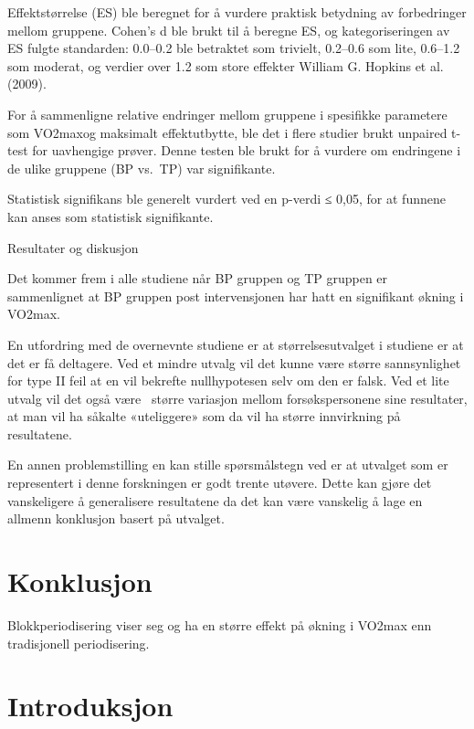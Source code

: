 \documentclass[
  letterpaper,
  DIV=11,
  numbers=noendperiod]{scrreprt}
\begin{document}
Effektstørrelse (ES) ble beregnet for å vurdere praktisk betydning av
forbedringer mellom gruppene. Cohen's d ble brukt til å beregne ES, og
kategoriseringen av ES fulgte standarden: 0.0--0.2 ble betraktet som
trivielt, 0.2--0.6 som lite, 0.6--1.2 som moderat, og verdier over 1.2
som store effekter William G. Hopkins et al. (2009).

For å sammenligne relative endringer mellom gruppene i spesifikke
parametere som VO2maxog maksimalt effektutbytte, ble det i flere studier
brukt unpaired t-test for uavhengige prøver. Denne testen ble brukt for
å vurdere om endringene i de ulike gruppene (BP vs.~TP) var
signifikante.

Statistisk signifikans ble generelt vurdert ved en p-verdi ≤ 0,05, for
at funnene kan anses som statistisk signifikante.

Resultater og diskusjon

Det kommer frem i alle studiene når BP gruppen og TP gruppen er
sammenlignet at BP gruppen post intervensjonen har hatt en signifikant
økning i VO2max.~

En utfordring med de overnevnte studiene er at størrelsesutvalget i
studiene er at det er få deltagere. Ved et mindre utvalg vil det kunne
være større sannsynlighet for type II feil at en vil bekrefte
nullhypotesen selv om den er falsk. Ved et lite utvalg vil det også
være~ større variasjon mellom forsøkspersonene sine resultater, at man
vil ha såkalte «uteliggere» som da vil ha større innvirkning på
resultatene.

En annen problemstilling en kan stille spørsmålstegn ved er at utvalget
som er representert i denne forskningen er godt trente utøvere. Dette
kan gjøre det vanskeligere å generalisere resultatene da det kan være
vanskelig å lage en allmenn konklusjon basert på utvalget.


\chapter{Konklusjon}\label{konklusjon}

Blokkperiodisering viser seg og ha en større effekt på økning i VO2max
enn tradisjonell periodisering.


\chapter{Introduksjon}\label{introduksjon-4}
\end{document}
